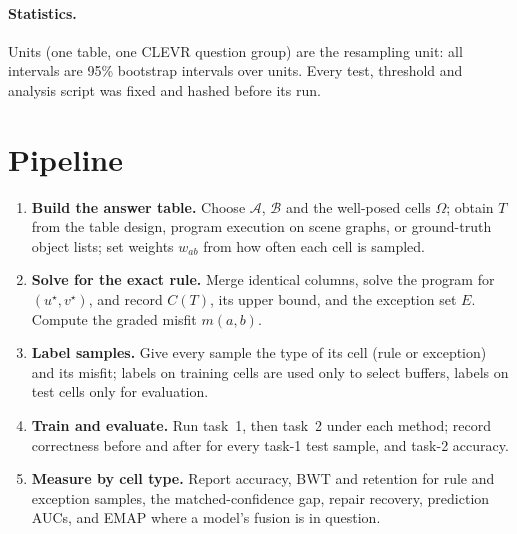 \documentclass[11pt]{article}
\newcommand{\1}{\mathbf{1}}
\begin{document}
\paragraph{Statistics.} Units (one table, one CLEVR question group) are the resampling unit: all intervals are 95\%
bootstrap intervals over units. Every test, threshold and analysis script was fixed and hashed before its run.

\section{Pipeline}\label{sec:flow}

\begin{enumerate}[leftmargin=1.5em, label=\textbf{Step \arabic*.}]
  \item \textbf{Build the answer table.} Choose $\mathcal{A}$, $\mathcal{B}$ and the well-posed cells $\Omega$; obtain
        $T$ from the table design, program execution on scene graphs, or ground-truth object lists; set weights
        $w_{ab}$ from how often each cell is sampled.
  \item \textbf{Solve for the exact rule.} Merge identical columns, solve the program for $(u^\star,v^\star)$, and
        record $C(T)$, its upper bound, and the exception set $E$. Compute the graded misfit $m(a,b)$.
  \item \textbf{Label samples.} Give every sample the type of its cell (rule or exception) and its misfit; labels on
        training cells are used only to select buffers, labels on test cells only for evaluation.
  \item \textbf{Train and evaluate.} Run task~1, then task~2 under each method; record correctness before and after
        for every task-1 test sample, and task-2 accuracy.
  \item \textbf{Measure by cell type.} Report accuracy, BWT and retention for rule and exception samples, the
        matched-confidence gap, repair recovery, prediction AUCs, and EMAP where a model's fusion is in question.
\end{enumerate}
\end{document}
